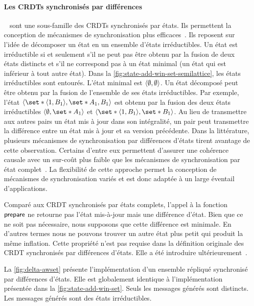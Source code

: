 \paragraph{Les \acp{CRDT} synchronisés par différences}~\autocite{almeida_2018_delta-crdt-revisited} sont une sous-famille des \acp{CRDT} synchronisés par états.
Ils permettent la conception de mécanismes de synchronisation plus efficaces~\autocite{enes_2018_efficient-sync-state-based-crdt}.
Ils reposent sur l'idée de décomposer un état en un ensemble d'états irréductibles.
Un état est irréductible si et seulement s'il ne peut pas être obtenu par la fusion de deux états distincts et s'il ne correspond pas à un état minimal (un état qui est inférieur à tout autre état).
Dans la \autoref{fig:state-add-win-set-semilattice}, les états irréductibles sont entourés.
L'état minimal est $\tuple*{\emptyset, \emptyset}$.
Un état décomposé peut être obtenu par la fusion de l'ensemble de ses états irréductibles.
Par exemple, l'état $\tuple*{\set*{\tuple*{1,B_1}}, \set*{A_1,B_1}}$ est obtenu par la fusion des deux états irréductibles $\tuple*{\emptyset, \set*{A_1}}$ et $\tuple*{\set*{\tuple*{1,B_1}}, \set*{B_1}}$.
Au lieu de transmettre aux autres pairs un état mis à jour dans son intégralité, un pair peut transmettre la différence entre un état mis à jour et sa version précédente.
Dans la littérature, plusieurs mécanismes de synchronisation par différences d'états tirent avantage de cette observation.
Certains d'entre eux permettent d'assurer une cohérence causale avec un sur-coût plus faible que les mécanismes de synchronisation par état complet~\autocite{enes_2018_efficient-sync-state-based-crdt}.
La flexibilité de cette approche permet la conception de mécanismes de synchronisation variés et est donc adaptée à un large éventail d'applications.

Comparé aux \ac{CRDT} synchronisés par états complets, l'appel à la fonction $\trm{prepare}$ ne retourne pas l'état mis-à-jour mais une différence d'état.
Bien que ce ne soit pas nécessaire, nous supposons que cette différence est minimale.
En d'autres termes nous ne pouvons trouver un autre état plus petit qui produit la même inflation.
Cette propriété n'est pas requise dans la définition originale des \ac{CRDT} synchronisés par différences d'états.
Elle a été introduire ultérieurement~\autocite{enes_2018_efficient-sync-state-based-crdt}.

La \autoref{fig:delta-awset} présente l'implémentation d'un ensemble répliqué synchronisé par différences d'états.
Elle est globalement identique à l'implémentation présentée dans la \autoref{fig:state-add-win-set}.
Seuls les messages générés sont distincts.
Les messages générés sont des états irréductibles.

